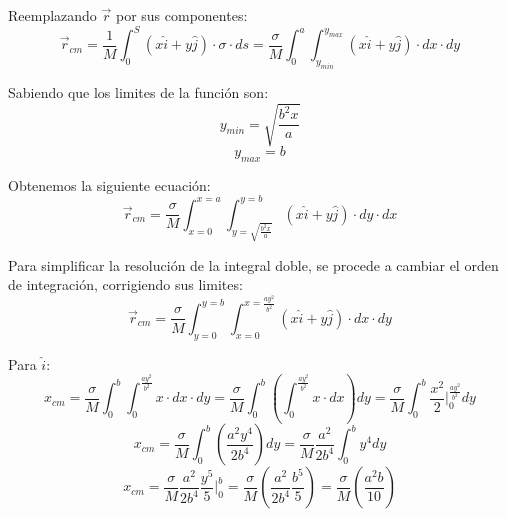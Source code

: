 \documentclass[letter,11pt]{article}
\begin{document}
Reemplazando $\vec{r}$ por sus componentes:
\begin{equation*}
    \vec{r}_{cm} = \frac{1}{M} \int_{0}^{S} (x \hat{i} + y \hat{j}) \cdot \sigma \cdot ds = \frac{\sigma}{M} \int_{0}^{a} \int_{y_{min}}^{y_{max}} (x \hat{i} + y \hat{j}) \cdot dx \cdot dy
\end{equation*}

Sabiendo que los limites de la función son:
\begin{equation*}
    y_{min} = \sqrt{\frac{b^2 x}{a}}
\end{equation*}
\begin{equation*}
    y_{max} = b
\end{equation*}

Obtenemos la siguiente ecuación:
\begin{equation*}
    \vec{r}_{cm} = \frac{\sigma}{M} \int_{x = 0}^{x = a} \int_{y = \sqrt{\frac{b^2 x}{a}}}^{y = b} (x \hat{i} + y \hat{j}) \cdot dy \cdot dx
\end{equation*}

Para simplificar la resolución de la integral doble, se procede a cambiar el orden de integración, corrigiendo sus limites:
\begin{equation*}
    \vec{r}_{cm} = \frac{\sigma}{M} \int_{y = 0}^{y = b} \int_{x = 0}^{x = \frac{a y^2}{b^2}} (x \hat{i} + y \hat{j}) \cdot dx \cdot dy
\end{equation*}

Para $\hat{i}$:
\begin{equation*}
    x_{cm} = \frac{\sigma}{M} \int_{0}^{b} \int_{0}^{\frac{a y^2}{b^2}} x \cdot dx \cdot dy = \frac{\sigma}{M} \int_{0}^{b} \left(\int_{0}^{\frac{a y^2}{b^2}} x \cdot dx \right) dy = \frac{\sigma}{M} \int_{0}^{b} \frac{x^2}{2}\Biggr|_{0}^{\frac{a y^2}{b^2}} dy
\end{equation*}
\begin{equation*}
    x_{cm} = \frac{\sigma}{M} \int_{0}^{b} \left(\frac{a^2 y^4}{2 b^4} \right) dy = \frac{\sigma}{M} \frac{a^2}{2 b^4} \int_{0}^{b} y^4 dy
\end{equation*}
\begin{equation*}
    x_{cm} = \frac{\sigma}{M} \frac{a^2}{2 b^4} \frac{y^5}{5}\Biggr|_{0}^{b} = \frac{\sigma}{M} \left(\frac{a^2}{2 b^4} \frac{b^5}{5}\right) = \frac{\sigma}{M} \left(\frac{a^2 b}{10}\right)
\end{equation*}
\end{document}
